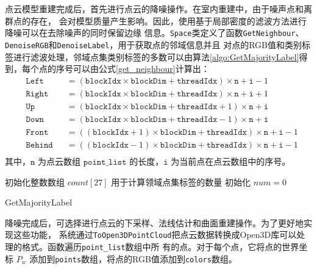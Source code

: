 \par 点云模型重建完成后，首先进行点云的降噪操作。在室内重建中，由于噪声点和离群点的存在，
会对模型质量产生影响。因此，使用基于局部密度的滤波方法进行降噪可以在去除噪声的同时保留边缘
信息。\texttt{Space}类定义了函数\texttt{GetNeighbour}、\texttt{DenoiseRGB}和\texttt{DenoiseLabel}，用于获取点的邻域信息并且
对点的RGB值和类别标签进行滤波处理，邻域点集类别标签的多数可以由算法\ref{algo:GetMajorityLabel}得到，每个点的序号可以由公式\ref{get_neighbour}计算出：
\begin{equation}
	\begin{aligned}
		& \texttt{Left}   &  & = (\texttt{blockIdx} \times \texttt{blockDim} + \texttt{threadIdx}) \times \texttt{n} + \texttt{i} - 1       \\
		& \texttt{Right}  &  & = (\texttt{blockIdx} \times \texttt{blockDim} + \texttt{threadIdx}) \times \texttt{n} + \texttt{i} + 1       \\
		& \texttt{Up}     &  & = (\texttt{blockIdx} \times \texttt{blockDim} + \texttt{threadIdx} + 1) \times \texttt{n} + \texttt{i}       \\
		& \texttt{Down}   &  & = (\texttt{blockIdx} \times \texttt{blockDim} + \texttt{threadIdx} - 1) \times \texttt{n} + \texttt{i}       \\
		& \texttt{Front}  &  & = ((\texttt{blockIdx} + 1) \times \texttt{blockDim} + \texttt{threadIdx}) \times \texttt{n} + \texttt{i} - 1 \\
		& \texttt{Behind} &  & = ((\texttt{blockIdx} - 1) \times \texttt{blockDim} + \texttt{threadIdx}) \times \texttt{n} + \texttt{i} - 1 \\
	\end{aligned}
	\label{get_neighbour}
\end{equation}
其中，$\texttt{n}$ 为点云数组 $\texttt{point\_list}$ 的长度，$\texttt{i}$ 为当前点在点云数组中的序号。

\begin{algorithm}[htb]
	\SetAlgoLined
	初始化整数数组 $count[27]$ 用于计算领域点集标签的数量\;
	初始化 $num = 0$\;
	\caption{GetMajorityLabel}
	\label{algo:GetMajorityLabel}
\end{algorithm}

\par 降噪完成后，可选择进行点云的下采样、法线估计和曲面重建操作。为了更好地实现这些功能，
系统通过\texttt{ToOpen3DPointCloud}把点云数据转换成Open3D库可以处理的格式。函数遍历\texttt{point\_list}数组中所
有的点。对于每个点，它将点的世界坐标 $P_w$ 添加到\texttt{points}数组，将点的RGB值添加到\texttt{colors}数组。

